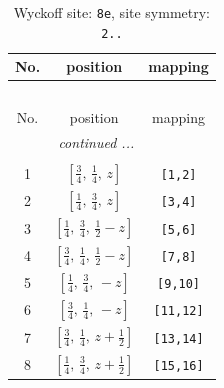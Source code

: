 \documentclass[fleqn,8pt]{jsarticle}
\begin{document}
\renewcommand{\arraystretch}{1.2}
\begin{longtable}{ccc}
\caption{Wyckoff site: {\tt 8e}, site symmetry: {\tt 2..}}
 \\
 \hline \hline
No. & position & mapping \\ \hline \endfirsthead

\multicolumn{2}{l}{\tablename\ \thetable{}} \\
 \hline \hline
No. & position & mapping \\ \hline \endhead

 \hline \hline
\multicolumn{2}{r}{\footnotesize\it continued ...} \\ \endfoot

 \hline \hline
\multicolumn{2}{r}{} \\ \endlastfoot

1 & $\left[ \frac{3}{4},\, \frac{1}{4},\, z \right]$ & {\tt [1,2]} \\ \hline
2 & $\left[ \frac{1}{4},\, \frac{3}{4},\, z \right]$ & {\tt [3,4]} \\ \hline
3 & $\left[ \frac{1}{4},\, \frac{3}{4},\, \frac{1}{2} - z \right]$ & {\tt [5,6]} \\ \hline
4 & $\left[ \frac{3}{4},\, \frac{1}{4},\, \frac{1}{2} - z \right]$ & {\tt [7,8]} \\ \hline
5 & $\left[ \frac{1}{4},\, \frac{3}{4},\, - z \right]$ & {\tt [9,10]} \\ \hline
6 & $\left[ \frac{3}{4},\, \frac{1}{4},\, - z \right]$ & {\tt [11,12]} \\ \hline
7 & $\left[ \frac{3}{4},\, \frac{1}{4},\, z + \frac{1}{2} \right]$ & {\tt [13,14]} \\ \hline
8 & $\left[ \frac{1}{4},\, \frac{3}{4},\, z + \frac{1}{2} \right]$ & {\tt [15,16]} \\
\end{longtable}
\renewcommand{\arraystretch}{1.2}
\end{document}
